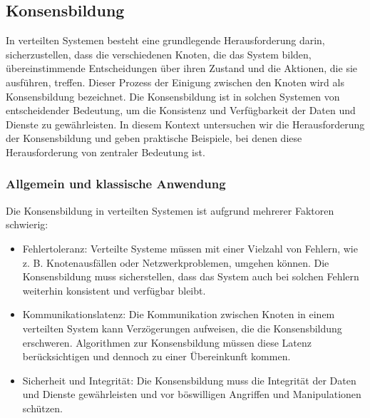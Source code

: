 \documentclass[../vs-script-first-v01.tex]{subfiles}
\begin{document}
\label{Woche09}
\subsection{Konsensbildung}

In verteilten Systemen besteht eine grundlegende Herausforderung darin, sicherzustellen, dass die verschiedenen Knoten, die das System bilden, übereinstimmende Entscheidungen über ihren Zustand und die Aktionen, die sie ausführen, treffen. Dieser Prozess der Einigung zwischen den Knoten wird als Konsensbildung bezeichnet. Die Konsensbildung ist in solchen Systemen von entscheidender Bedeutung, um die Konsistenz und Verfügbarkeit der Daten und Dienste zu gewährleisten. In diesem Kontext untersuchen wir die Herausforderung der Konsensbildung und geben praktische Beispiele, bei denen diese Herausforderung von zentraler Bedeutung ist.
\subsubsection{Allgemein und klassische Anwendung}
Die Konsensbildung in verteilten Systemen ist aufgrund mehrerer Faktoren schwierig:
\begin{itemize}
\item  Fehlertoleranz: Verteilte Systeme müssen mit einer Vielzahl von Fehlern, wie z. B. Knotenausfällen oder Netzwerkproblemen, umgehen können. Die Konsensbildung muss sicherstellen, dass das System auch bei solchen Fehlern weiterhin konsistent und verfügbar bleibt.

\item Kommunikationslatenz: Die Kommunikation zwischen Knoten in einem verteilten System kann Verzögerungen aufweisen, die die Konsensbildung erschweren. Algorithmen zur Konsensbildung müssen diese Latenz berücksichtigen und dennoch zu einer Übereinkunft kommen.

\item  Sicherheit und Integrität: Die Konsensbildung muss die Integrität der Daten und Dienste gewährleisten und vor böswilligen Angriffen und Manipulationen schützen.
\end{itemize}
\end{document}
